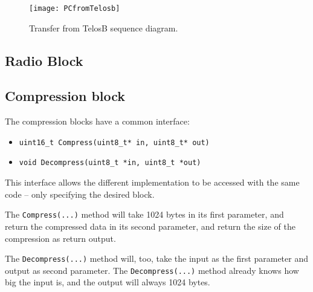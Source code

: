 \begin{figure}[H]
	\centering
	\texttt{[image: PCfromTelosb]}
	\caption{Transfer from TelosB sequence diagram.}
	\label{transferfromtelos}
\end{figure}

\subsection{Radio Block}

\subsection{Compression block}
The compression blocks have a common interface: 

\begin{itemize}
    \item \texttt{uint16\_t Compress(uint8\_t* in, uint8\_t* out)}
    \item \texttt{void Decompress(uint8\_t *in, uint8\_t *out)}
\end{itemize}

This interface allows the different implementation to be accessed with the same code -- only specifying the desired block.

The \texttt{Compress(...)} method will take 1024 bytes in its first parameter, and return the compressed data in its second parameter, and return the size of the compression as return output.

The \texttt{Decompress(...)} method will, too, take the input as the first parameter and output as second parameter. 
The \texttt{Decompress(...)} method already knows how big the input is, and the output will always 1024 bytes.
